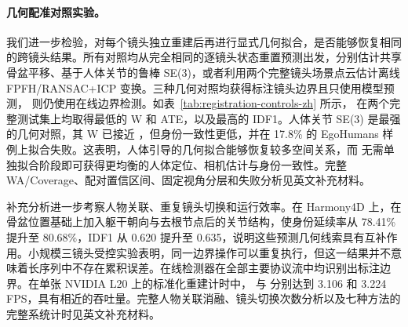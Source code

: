\paragraph{几何配准对照实验。}
我们进一步检验，对每个镜头独立重建后再进行显式几何拟合，是否能够恢复相同的跨镜头结果。所有对照均从完全相同的逐镜头状态重置预测出发，分别估计共享骨盆平移、基于人体关节的鲁棒 SE(3)，或者利用两个完整镜头场景点云估计离线 FPFH/RANSAC+ICP 变换。三种几何对照均获得标注镜头边界且只使用模型预测，\method{} 则仍使用在线边界检测。如表~\ref{tab:registration-controls-zh} 所示，\method{} 在两个完整测试集上均取得最低的 W 和 ATE，以及最高的 IDF1。人体关节 SE(3) 是最强的几何对照，其 W 已接近 \method{}，但身份一致性更低，并在 17.8\% 的 EgoHumans 样例上拟合失败。这表明，人体引导的几何拟合能够恢复较多空间关系，而 \method{} 无需单独拟合阶段即可获得更均衡的人体定位、相机估计与身份一致性。完整 WA/Coverage、配对置信区间、固定视角分层和失败分析见英文补充材料。



补充分析进一步考察人物关联、重复镜头切换和运行效率。在 Harmony4D 上，在骨盆位置基础上加入躯干朝向与去根节点后的关节结构，使身份延续率从 78.41\% 提升至 80.68\%，IDF1 从 0.620 提升至 0.635，说明这些预测几何线索具有互补作用。小规模三镜头受控实验表明，同一边界操作可以重复执行，但这一结果并不意味着长序列中不存在累积误差。在线检测器在全部主要协议流中均识别出标注边界。在单张 NVIDIA L20 上的标准化重建计时中，\method{} 与 \humanthree{} 分别达到 3.106 和 3.224 FPS，具有相近的吞吐量。完整人物关联消融、镜头切换次数分析以及七种方法的完整系统计时见英文补充材料。
